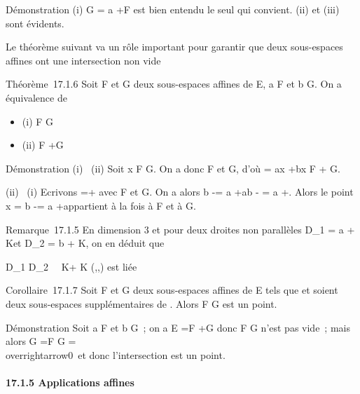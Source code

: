 \documentclass[]{article}
\begin{document}
Démonstration (i) G = a +\overrightarrow F est bien
entendu le seul qui convient. (ii) et (iii) sont évidents.

Le théorème suivant va \jmathouer un rôle important pour garantir que deux
sous-espaces affines ont une intersection non vide

Théorème~17.1.6 Soit F et G deux sous-espaces affines de E, a \in F et b \in
G. On a équivalence de

\begin{itemize}
\itemsep1pt\parskip0pt
\item
  (i) F \bigcap G\neq~\varnothing~
\item
  (ii) \overrightarrowab
  \in\overrightarrow F
  +\overrightarrow G
\end{itemize}

Démonstration (i) \rigtharrow~(ii) Soit x \in F \bigcap G. On a donc
\overrightarrowax \in\overrightarrow
F et \overrightarrowxb
\in\overrightarrow G, d'où
\overrightarrowab =\overrightarrow
ax +\overrightarrow bx
\in\overrightarrow F +\overrightarrow
G.

(ii) \rigtharrow~(i) Ecrivons \overrightarrowab
=\overrightarrow \xi +\overrightarrow
\eta avec \overrightarrow\xi
\in\overrightarrow F et
\overrightarrow\eta \in\overrightarrow
G. On a alors b -\overrightarrow \eta = a
+\overrightarrow ab -\overrightarrow
\eta = a +\overrightarrow \xi. Alors le point x = b
-\overrightarrow \eta = a
+\overrightarrow \xi appartient à la fois à F et à G.

Remarque~17.1.5 En dimension 3 et pour deux droites non parallèles
D\_1 = a + K\vecu et D\_2 = b +
K\vecv, on en déduit que

D\_1 \bigcap
D\_2\neq~\varnothing~\mathrel\Leftrightarrow
\overrightarrowab \in K\vecu +
K\vecv \Leftrightarrow
(\overrightarrowab,\vecu,\vecv)\text
est liée 

Corollaire~17.1.7 Soit F et G deux sous-espaces affines de E tels que
\overrightarrowF et
\overrightarrowG soient deux sous-espaces
supplémentaires de \overrightarrowE. Alors F \bigcap G est
un point.

Démonstration Soit a \in F et b \in G~; on a
\overrightarrowab \in\overrightarrow
E =\overrightarrow F
+\overrightarrow G donc F \bigcap G n'est pas vide~; mais
alors \overrightarrowF \bigcap G
=\overrightarrow F \bigcap\overrightarrow
G =
\\overrightarrow0\
et donc l'intersection est un point.

\paragraph{17.1.5 Applications affines}
\end{document}

